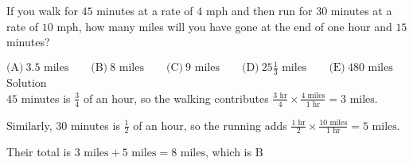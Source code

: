 

If you walk for $45$ minutes at a rate of $4 \text{ mph}$ and then run for $30$ minutes at a rate of $10\text{ mph}$, how many miles will you have gone at the end of one hour and $15$ minutes?

$\text{(A)}\ 3.5\text{ miles} \qquad \text{(B)}\ 8\text{ miles} \qquad \text{(C)}\ 9\text{ miles} \qquad \text{(D)}\ 25\frac{1}{3}\text{ miles} \qquad \text{(E)}\ 480\text{ miles}$
\\
Solution
\\
$45$ minutes is $\frac{3}{4}$ of an hour, so the walking contributes $\frac{3\text{ hr}}{4}\times \frac{4 \text{ miles}}{1\text{ hr}}=3\text{ miles}$.

Similarly, $30$ minutes is $\frac{1}{2}$ of an hour, so the running adds $\frac{1\text{ hr}}{2}\times\frac{10\text{ miles}}{1\text{ hr}}=5\text{ miles}$.

Their total is $3\text{ miles}+5\text{ miles}=8\text{ miles}$, which is $\boxed{\text{B}}$
